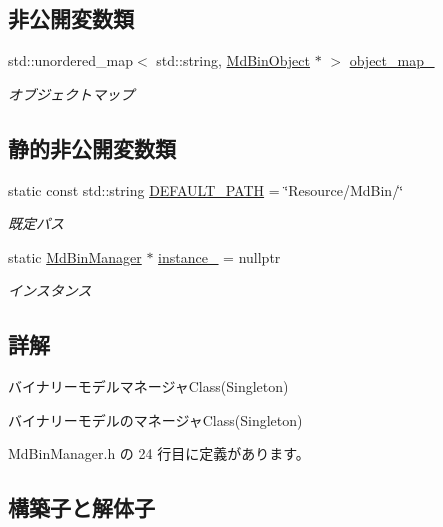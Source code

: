 \subsection*{非公開変数類}
\begin{DoxyCompactItemize}
\item 
std\+::unordered\+\_\+map$<$ std\+::string, \mbox{\hyperlink{class_md_bin_object}{Md\+Bin\+Object}} $\ast$ $>$ \mbox{\hyperlink{class_md_bin_manager_a595804fccdd750e02df524bb75cec65b}{object\+\_\+map\+\_\+}}
\begin{DoxyCompactList}\small\item\em オブジェクトマップ \end{DoxyCompactList}\end{DoxyCompactItemize}
\subsection*{静的非公開変数類}
\begin{DoxyCompactItemize}
\item 
static const std\+::string \mbox{\hyperlink{class_md_bin_manager_a904425a5d0777470e0723d54fb36a54a}{D\+E\+F\+A\+U\+L\+T\+\_\+\+P\+A\+TH}} = \char`\"{}Resource/Md\+Bin/\char`\"{}
\begin{DoxyCompactList}\small\item\em 既定パス \end{DoxyCompactList}\item 
static \mbox{\hyperlink{class_md_bin_manager}{Md\+Bin\+Manager}} $\ast$ \mbox{\hyperlink{class_md_bin_manager_a119c1fd5422e8106a9fc4ee361ad2ea0}{instance\+\_\+}} = nullptr
\begin{DoxyCompactList}\small\item\em インスタンス \end{DoxyCompactList}\end{DoxyCompactItemize}


\subsection{詳解}
バイナリーモデルマネージャ\+Class(\+Singleton) 

バイナリーモデルのマネージャ\+Class(\+Singleton) 

 Md\+Bin\+Manager.\+h の 24 行目に定義があります。



\subsection{構築子と解体子}
\mbox{\label{class_md_bin_manager_a9badcf5942fc3c2610392df35184d73d}} 
